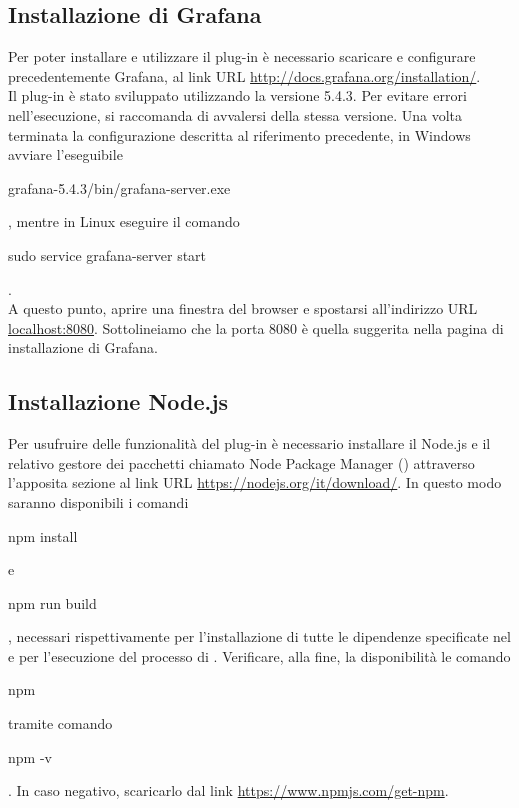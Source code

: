 \subsection{Installazione di Grafana}
Per poter installare e utilizzare il plug-in è necessario scaricare e configurare precedentemente Grafana, al link URL \url{http://docs.grafana.org/installation/}. \\
Il plug-in è stato sviluppato utilizzando la versione 5.4.3. Per evitare errori nell'esecuzione, si raccomanda di avvalersi della stessa versione.
Una volta terminata la configurazione descritta al riferimento precedente, in Windows avviare l'eseguibile\\ \begin{ttfamily}grafana-5.4.3/bin/grafana-server.exe\end{ttfamily}, mentre in Linux eseguire il comando\\ \begin{ttfamily}sudo service grafana-server start\end{ttfamily}.\\
A questo punto, aprire una finestra del browser e spostarsi all'indirizzo URL \url{localhost:8080}. Sottolineiamo che la porta 8080 è quella suggerita nella pagina di installazione di Grafana.

\subsection{Installazione Node.js}
Per usufruire delle funzionalità del plug-in è necessario installare il  Node.js e il relativo gestore dei pacchetti chiamato Node Package Manager () attraverso l'apposita sezione al link URL \url{https://nodejs.org/it/download/}. In questo modo saranno disponibili i comandi \begin{ttfamily}npm install\end{ttfamily} e \begin{ttfamily}npm run build\end{ttfamily}, necessari rispettivamente per l'installazione di tutte le dipendenze specificate nel  e per l'esecuzione del processo di .
Verificare, alla fine, la disponibilità le comando \begin{ttfamily}npm\end{ttfamily} tramite comando \begin{ttfamily}npm -v\end{ttfamily}. In caso negativo, scaricarlo dal link \url{https://www.npmjs.com/get-npm}.

